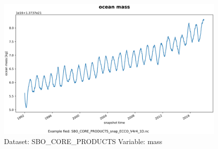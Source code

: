 \begin{figure}[H]
\centering
\includegraphics[width=\textwidth]{../images/plots/oneD_plots/SBO_Core_Products/mass.png}
\caption{Dataset: SBO\_CORE\_PRODUCTS Variable: mass}
\label{tab:table-SBO_CORE_PRODUCTS_mass-Plot}
\end{figure}
\pagebreak
